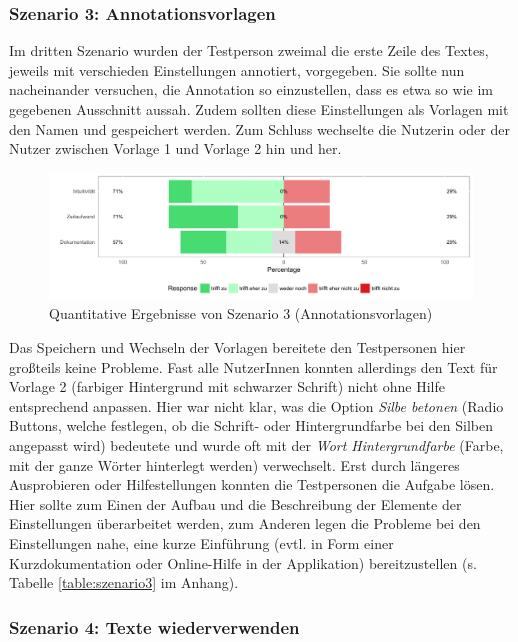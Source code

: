 \subsubsection{Szenario 3: Annotationsvorlagen}

Im dritten Szenario wurden der Testperson zweimal die erste Zeile des Textes, jeweils mit verschieden Einstellungen annotiert, vorgegeben. Sie sollte nun nacheinander versuchen, die Annotation so einzustellen, dass es etwa so wie im gegebenen Ausschnitt aussah. Zudem sollten diese Einstellungen als Vorlagen mit den Namen  und  gespeichert werden. Zum Schluss wechselte die Nutzerin oder der Nutzer zwischen Vorlage 1 und Vorlage 2 hin und her.

\begin{figure}[h!]
	\centering
	\includegraphics[width=.8\linewidth]{figures/evaluation/scenario3}
	\caption{Quantitative Ergebnisse von Szenario 3 (Annotationsvorlagen)}
	\label{fig:evaluation-sc3}
\end{figure}

Das Speichern und Wechseln der Vorlagen bereitete den Testpersonen hier großteils keine Probleme. Fast alle NutzerInnen konnten allerdings den Text für Vorlage 2 (farbiger Hintergrund mit schwarzer Schrift) nicht ohne Hilfe entsprechend anpassen. Hier war nicht klar, was die Option \textit{Silbe betonen} (Radio Buttons, welche festlegen, ob die Schrift- oder Hintergrundfarbe bei den Silben angepasst wird) bedeutete und wurde oft mit der \textit{Wort Hintergrundfarbe} (Farbe, mit der ganze Wörter hinterlegt werden) verwechselt. Erst durch längeres Ausprobieren oder Hilfestellungen konnten die Testpersonen die Aufgabe lösen. Hier sollte zum Einen der Aufbau und die Beschreibung der Elemente der Einstellungen überarbeitet werden, zum Anderen legen die Probleme bei den Einstellungen nahe, eine kurze Einführung (evtl. in Form einer Kurzdokumentation oder Online-Hilfe in der Applikation) bereitzustellen (s. Tabelle \ref{table:szenario3} im Anhang).

\subsubsection{Szenario 4: Texte wiederverwenden}


